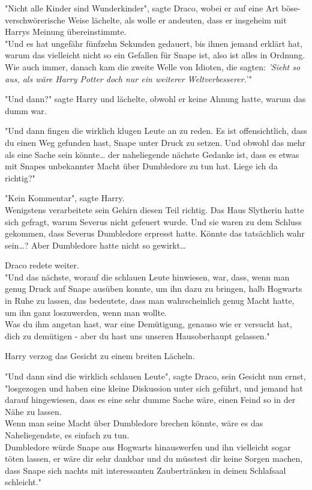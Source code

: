 {"Nicht alle Kinder sind Wunderkinder", sagte Draco, wobei er auf eine Art böse-verschwörerische Weise lächelte, als wolle er andeuten, dass er insgeheim mit Harrys Meinung übereinstimmte.\\ "Und es hat ungefähr fünfzehn Sekunden gedauert, bis ihnen jemand erklärt hat, warum das vielleicht nicht so ein Gefallen für Snape ist, also ist alles in Ordnung.\\ Wie auch immer, danach kam die zweite Welle von Idioten, die sagten: \emph{'Sieht so aus, als wäre Harry Potter doch nur ein weiterer Weltverbesserer.}'"

"Und dann?" sagte Harry und lächelte, obwohl er keine Ahnung hatte, warum das dumm war.

"Und dann fingen die wirklich klugen Leute an zu reden. Es ist offensichtlich, dass du einen Weg gefunden hast, Snape unter Druck zu setzen. Und obwohl das mehr als eine Sache sein könnte… der naheliegende nächste Gedanke ist, dass es etwas mit Snapes unbekannter Macht über Dumbledore zu tun hat. Liege ich da richtig?"

"Kein Kommentar", sagte Harry.\\ Wenigstens verarbeitete sein Gehirn diesen Teil richtig. Das Haus Slytherin hatte sich gefragt, warum Severus nicht gefeuert wurde. Und sie waren zu dem Schluss gekommen, dass Severus Dumbledore erpresst hatte. Könnte das tatsächlich wahr sein…? Aber Dumbledore hatte nicht so gewirkt…

Draco redete weiter.\\ "Und das nächste, worauf die schlauen Leute hinwiesen, war, dass, wenn man genug Druck auf Snape ausüben konnte, um ihn dazu zu bringen, halb Hogwarts in Ruhe zu lassen, das bedeutete, dass man wahrscheinlich genug Macht hatte, um ihn ganz loszuwerden, wenn man wollte.\\ Was du ihm angetan hast, war eine Demütigung, genauso wie er versucht hat, dich zu demütigen - aber du hast uns unseren Hausoberhaupt gelassen."

Harry verzog das Gesicht zu einem breiten Lächeln.

"Und dann sind die wirklich schlauen Leute", sagte Draco, sein Gesicht nun ernst,\\ "losgezogen und haben eine kleine Diskussion unter sich geführt, und jemand hat darauf hingewiesen, dass es eine sehr dumme Sache wäre, einen Feind so in der Nähe zu lassen.\\ Wenn man seine Macht über Dumbledore brechen könnte, wäre es das Naheliegendste, es einfach zu tun.\\ Dumbledore würde Snape aus Hogwarts hinauswerfen und ihn vielleicht sogar töten lassen, er wäre dir sehr dankbar und du müsstest dir keine Sorgen machen, dass Snape sich nachts mit interessanten Zaubertränken in deinen Schlafsaal schleicht."

}
